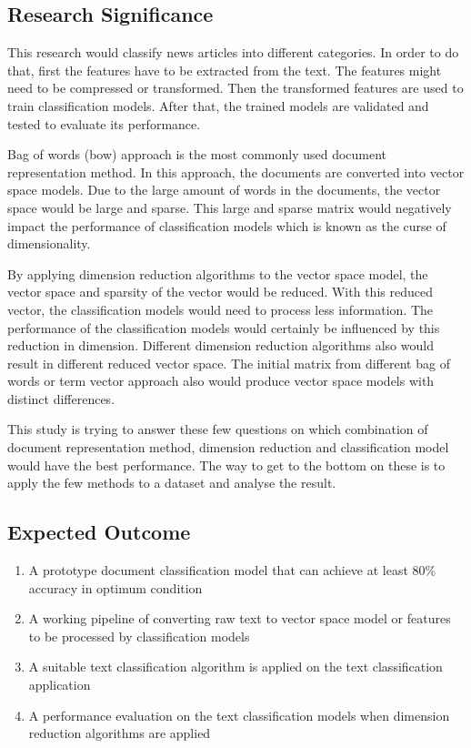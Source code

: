 \subsection{Research Significance}
This research would classify news articles into different categories. In order to do that, first the features have to be extracted from the text. The features might need to be compressed or transformed. Then the transformed features are used to train classification models. After that, the trained models are validated and tested to evaluate its performance.

Bag of words (\ac{bow}) approach is the most commonly used document representation method. In this approach, the documents are converted into vector space models. Due to the large amount of words in the documents, the vector space would be large and sparse. This large and sparse matrix would negatively impact the performance of classification models which is known as the curse of dimensionality.

By applying dimension reduction algorithms to the vector space model, the vector space and sparsity of the vector would be reduced. With this reduced vector, the classification models would need to process less information. The performance of the classification models would certainly be influenced by this reduction in dimension. Different dimension reduction algorithms also would result in different reduced vector space. The initial matrix from different bag of words or term vector approach also would produce vector space models with distinct differences.

This study is trying to answer these few questions on which combination of document representation method, dimension reduction and classification model would have the best performance. The way to get to the bottom on these is to apply the few methods to a dataset and analyse the result.\\


\subsection{Expected Outcome}
\begin{enumerate}
	\item A prototype document classification model that can achieve at least 80\% accuracy in optimum condition
	\item A working pipeline of converting raw text to vector space model or features to be processed by classification models
	\item A suitable text classification algorithm is applied on the text classification application
	\item A performance evaluation on the text classification models when dimension reduction algorithms are applied
\end{enumerate}

